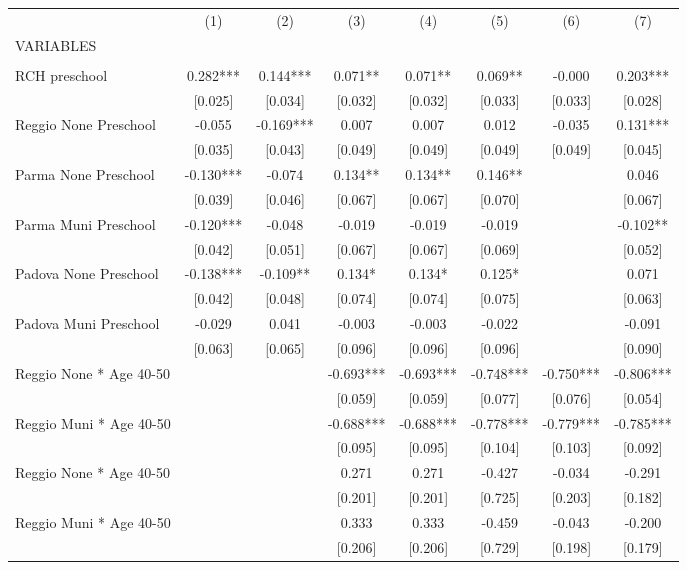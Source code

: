 \begin{tabular}{lccccccc} \hline
 & (1) & (2) & (3) & (4) & (5) & (6) & (7) \\
VARIABLES &  &  &  &  &  &  &  \\ \hline
 &  &  &  &  &  &  &  \\
RCH preschool & 0.282*** & 0.144*** & 0.071** & 0.071** & 0.069** & -0.000 & 0.203*** \\
 & [0.025] & [0.034] & [0.032] & [0.032] & [0.033] & [0.033] & [0.028] \\
Reggio None Preschool & -0.055 & -0.169*** & 0.007 & 0.007 & 0.012 & -0.035 & 0.131*** \\
 & [0.035] & [0.043] & [0.049] & [0.049] & [0.049] & [0.049] & [0.045] \\
Parma None Preschool & -0.130*** & -0.074 & 0.134** & 0.134** & 0.146** &  & 0.046 \\
 & [0.039] & [0.046] & [0.067] & [0.067] & [0.070] &  & [0.067] \\
Parma Muni Preschool & -0.120*** & -0.048 & -0.019 & -0.019 & -0.019 &  & -0.102** \\
 & [0.042] & [0.051] & [0.067] & [0.067] & [0.069] &  & [0.052] \\
Padova None Preschool & -0.138*** & -0.109** & 0.134* & 0.134* & 0.125* &  & 0.071 \\
 & [0.042] & [0.048] & [0.074] & [0.074] & [0.075] &  & [0.063] \\
Padova Muni Preschool & -0.029 & 0.041 & -0.003 & -0.003 & -0.022 &  & -0.091 \\
 & [0.063] & [0.065] & [0.096] & [0.096] & [0.096] &  & [0.090] \\
Reggio None * Age 40-50 &  &  & -0.693*** & -0.693*** & -0.748*** & -0.750*** & -0.806*** \\
 &  &  & [0.059] & [0.059] & [0.077] & [0.076] & [0.054] \\
Reggio Muni * Age 40-50 &  &  & -0.688*** & -0.688*** & -0.778*** & -0.779*** & -0.785*** \\
 &  &  & [0.095] & [0.095] & [0.104] & [0.103] & [0.092] \\
Reggio None * Age 40-50 &  &  & 0.271 & 0.271 & -0.427 & -0.034 & -0.291 \\
 &  &  & [0.201] & [0.201] & [0.725] & [0.203] & [0.182] \\
Reggio Muni * Age 40-50 &  &  & 0.333 & 0.333 & -0.459 & -0.043 & -0.200 \\
 &  &  & [0.206] & [0.206] & [0.729] & [0.198] & [0.179] \\

\end{tabular}

